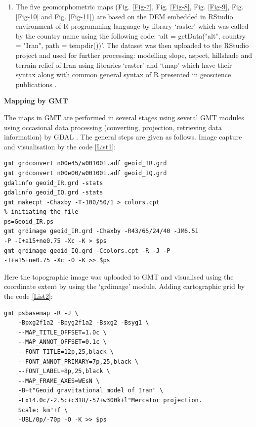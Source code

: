 \documentclass[12pt,a4paper,oneside]{article}
\def \newsubsection{\vspace{12pt}\textbf}
\begin{document}
\begin{enumerate}
	\item The five geomorphometric maps (Fig. \ref{Fig-7}, Fig. \ref{Fig-8}, Fig. \ref{Fig-9}, Fig. \ref{Fig-10} and Fig. \ref{Fig-11}) are based on the DEM embedded in RStudio environment \cite{RStudio} of R programming language \cite{RCoreTeam} by library ‘raster’ which was called by the country name using the following code: ‘alt = getData("alt", country = "Iran", path = tempdir())’. The dataset was then uploaded to the RStudio project and used for further processing: modelling slope, aspect, hillshade and terrain relief of Iran using libraries ‘raster’ \cite{Hijmans} and ‘tmap’ \cite{Tennekes} which have their syntax along with common general syntax of R presented in geoscience publications \cite{Lemenkova2019b,Lemenkova202007}.  
\end{enumerate}

\newsubsection {Mapping by GMT}

The maps in GMT are performed in several stages using several GMT modules \cite{Wessel2019} using occasional data processing (converting, projection, retrieving data information) by GDAL \cite{GDAL}. The general steps are given as follows. Image capture and visualisation by the code \ref{List1}: 

\begin{lstlisting}[frame=single]
gmt grdconvert n00e45/w001001.adf geoid_IR.grd
gmt grdconvert n00e00/w001001.adf geoid_IQ.grd
gdalinfo geoid_IR.grd -stats
gdalinfo geoid_IQ.grd -stats
gmt makecpt -Chaxby -T-100/50/1 > colors.cpt
% initiating the file
ps=Geoid_IR.ps
gmt grdimage geoid_IR.grd -Chaxby -R43/65/24/40 -JM6.5i 
-P -I+a15+ne0.75 -Xc -K > $ps
gmt grdimage geoid_IQ.grd -Ccolors.cpt -R -J -P 
-I+a15+ne0.75 -Xc -O -K >> $ps
\end{lstlisting}

Here the topographic image was uploaded to GMT and visualised using the coordinate extent by using the ‘grdimage’ module. Adding cartographic grid by the code \ref{List2}: 

\begin{lstlisting}[frame=single]
gmt psbasemap -R -J \
    -Bpxg2f1a2 -Bpyg2f1a2 -Bsxg2 -Bsyg1 \
    --MAP_TITLE_OFFSET=1.0c \
    --MAP_ANNOT_OFFSET=0.1c \
    --FONT_TITLE=12p,25,black \
    --FONT_ANNOT_PRIMARY=7p,25,black \
    --FONT_LABEL=8p,25,black \
    --MAP_FRAME_AXES=WEsN \
    -B+t"Geoid gravitational model of Iran" \
    -Lx14.0c/-2.5c+c318/-57+w300k+l"Mercator projection. 
    Scale: km"+f \
    -UBL/0p/-70p -O -K >> $ps
\end{lstlisting}
\end{document}
